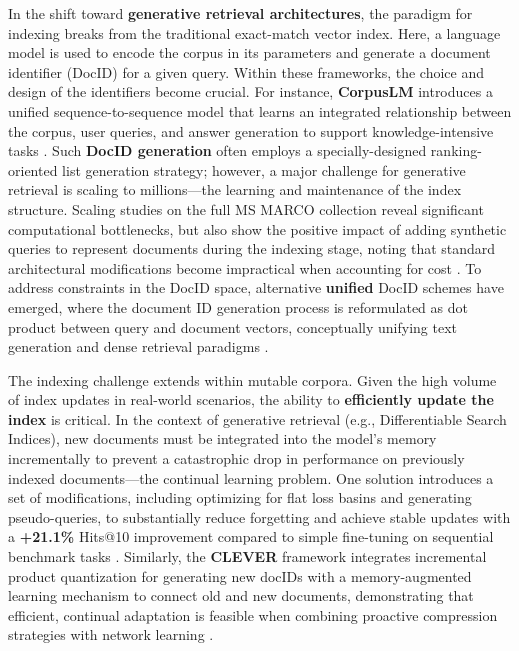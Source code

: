 \documentclass[11pt]{article}
\begin{document}
In the shift toward \textbf{generative retrieval architectures}, the paradigm for indexing breaks from the traditional exact-match vector index. Here, a language model is used to encode the corpus in its parameters and generate a document identifier (DocID) for a given query. Within these frameworks, the choice and design of the identifiers become crucial. For instance, \textbf{CorpusLM} introduces a unified sequence-to-sequence model that learns an integrated relationship between the corpus, user queries, and answer generation to support knowledge-intensive tasks \cite{ref117}. Such \textbf{DocID generation} often employs a specially-designed ranking-oriented list generation strategy; however, a major challenge for generative retrieval is scaling to millions---the learning and maintenance of the index structure. Scaling studies on the full MS MARCO collection reveal significant computational bottlenecks, but also show the positive impact of adding synthetic queries to represent documents during the indexing stage, noting that standard architectural modifications become impractical when accounting for cost \cite{ref118}. To address constraints in the DocID space, alternative \textbf{unified} DocID schemes have emerged, where the document ID generation process is reformulated as dot product between query and document vectors, conceptually unifying text generation and dense retrieval paradigms \cite{ref119}.

The indexing challenge extends within mutable corpora. Given the high volume of index updates in real-world scenarios, the ability to \textbf{efficiently update the index} is critical. In the context of generative retrieval (e.g., Differentiable Search Indices), new documents must be integrated into the model's memory incrementally to prevent a catastrophic drop in performance on previously indexed documents---the continual learning problem. One solution introduces a set of modifications, including optimizing for flat loss basins and generating pseudo-queries, to substantially reduce forgetting and achieve stable updates with a \textbf{+21.1\%} Hits@10 improvement compared to simple fine-tuning on sequential benchmark tasks \cite{ref120}. Similarly, the \textbf{CLEVER} framework integrates incremental product quantization for generating new docIDs with a memory-augmented learning mechanism to connect old and new documents, demonstrating that efficient, continual adaptation is feasible when combining proactive compression strategies with network learning \cite{ref121}.
\end{document}
